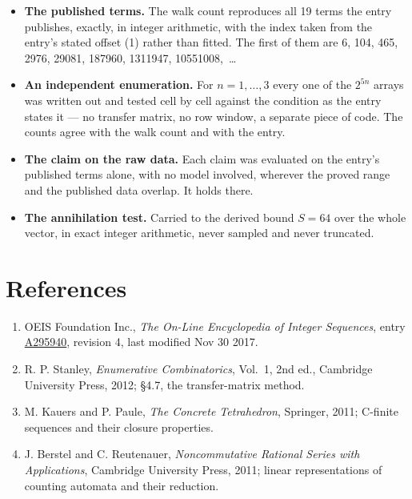 \documentclass[11pt]{article}
\theoremstyle{definition}
\begin{document}
\begin{itemize}

\item {\bfseries The published terms.} The walk count reproduces all 19 terms the entry publishes, exactly, in integer arithmetic, with the index taken from the entry's stated offset (1) rather than fitted. The first of them are 6, 104, 465, 2976, 29081, 187960, 1311947, 10551008,~\dots

\item {\bfseries An independent enumeration.} For $n = 1,\dots,3$ every one of the $2^{5n}$ arrays was written out and tested cell by cell against the condition as the entry states it --- no transfer matrix, no row window, a separate piece of code. The counts agree with the walk count and with the entry.

\item {\bfseries The claim on the raw data.} Each claim was evaluated on the entry's published terms alone, with no model involved, wherever the proved range and the published data overlap. It holds there.

\item {\bfseries The annihilation test.} Carried to the derived bound $S = 64$ over the whole vector, in exact integer arithmetic, never sampled and never truncated.

\end{itemize}

\section{References}

\begin{enumerate}

\item OEIS Foundation Inc., \emph{The On-Line Encyclopedia of Integer Sequences}, entry \href{https://oeis.org/A295940}{A295940}, revision 4, last modified Nov 30 2017.

\item R. P. Stanley, \emph{Enumerative Combinatorics}, Vol.~1, 2nd ed., Cambridge University Press, 2012; \S4.7, the transfer-matrix method.

\item M. Kauers and P. Paule, \emph{The Concrete Tetrahedron}, Springer, 2011; C-finite sequences and their closure properties.

\item J. Berstel and C. Reutenauer, \emph{Noncommutative Rational Series with Applications}, Cambridge University Press, 2011; linear representations of counting automata and their reduction.

\end{enumerate}
\end{document}
